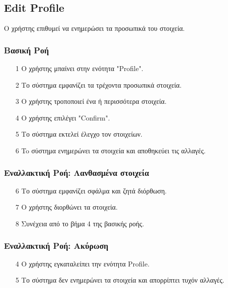 \subsection{Edit Profile}
\label{uc:edit-profile}

Ο χρήστης επιθυμεί να ενημερώσει τα προσωπικά του στοιχεία.

\subsubsection{Βασική Ροή}

\begin{enumerate}
    \item[1] Ο χρήστης μπαίνει στην ενότητα "Profile".
    \item[2] Το σύστημα εμφανίζει τα τρέχοντα προσωπικά στοιχεία.
    \item[3] Ο χρήστης τροποποιεί ένα ή περισσότερα στοιχεία.
    \item[4] Ο χρήστης επιλέγει "Confirm".
    \item[5] Το σύστημα εκτελεί έλεγχο τον στοιχείων.
    \item[6] To σύστημα ενημερώνει τα στοιχεία και αποθηκεύει τις αλλαγές.
\end{enumerate}

\subsubsection{Εναλλακτική Ροή: Λανθασμένα στοιχεία}

\begin{enumerate}
    \item[6] Το σύστημα εμφανίζει σφάλμα και ζητά διόρθωση.
    \item[7] Ο χρήστης διορθώνει τα στοιχεία.
    \item[8] Συνέχεια από το βήμα 4 της βασικής ροής.
\end{enumerate}

\subsubsection{Εναλλακτική Ροή: Ακύρωση}

\begin{enumerate}
    \item[4] Ο χρήστης εγκαταλείπει την ενότητα Profile.
    \item[5] Το σύστημα δεν ενημερώνει τα στοιχεία και απορρίπτει τυχόν αλλαγές.
\end{enumerate}




